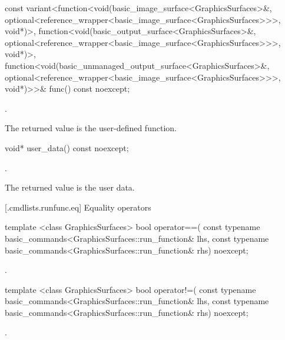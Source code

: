 %
\begin{itemdecl}
const variant<function<void(basic_image_surface<GraphicsSurfaces>&, 
  optional<reference_wrapper<basic_image_surface<GraphicsSurfaces>>>, 
  void*)>, function<void(basic_output_surface<GraphicsSurfaces>&, 
  optional<reference_wrapper<basic_image_surface<GraphicsSurfaces>>>, 
  void*)>, function<void(basic_unmanaged_output_surface<GraphicsSurfaces>&, 
  optional<reference_wrapper<basic_image_surface<GraphicsSurfaces>>>, 
  void*)>>& func() const noexcept;
\end{itemdecl}
\begin{itemdescr}
\pnum
\returns {}.

\pnum
\remarks
The returned value is the user-defined function.
\end{itemdescr}

%
\begin{itemdecl}
void* user_data() const noexcept;
\end{itemdecl}
\begin{itemdescr}
\pnum
\returns {}.

\pnum
\remarks
The returned value is the user data.
\end{itemdescr}

 [\iotwod.cmdlists.runfunc.eq] {Equality operators}%

%
\begin{itemdecl}
template <class GraphicsSurfaces>
bool operator==(
  const typename basic_commands<GraphicsSurfaces::run_function& lhs,
  const typename basic_commands<GraphicsSurfaces::run_function& rhs) 
  noexcept;
\end{itemdecl}
\begin{itemdescr}
\pnum
\returns {}.
\end{itemdescr}

%
\begin{itemdecl}
template <class GraphicsSurfaces>
bool operator!=(
  const typename basic_commands<GraphicsSurfaces::run_function& lhs,
  const typename basic_commands<GraphicsSurfaces::run_function& rhs) 
  noexcept;
\end{itemdecl}
\begin{itemdescr}
\pnum
\returns {}.
\end{itemdescr}
